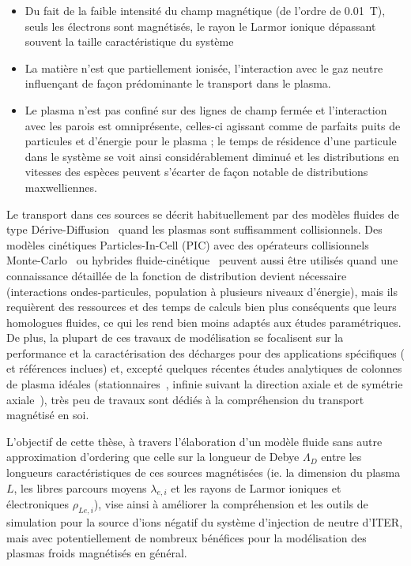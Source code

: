\begin{refsection}
\begin{itemize}
  \item Du fait de la faible intensité du champ magnétique (de l'ordre de
  0.01~T), seuls les électrons sont magnétisés, le rayon le Larmor ionique dépassant souvent la
  taille caractéristique du système
  \item La matière n'est que partiellement ionisée, l'interaction avec
  le gaz neutre influençant de façon prédominante le transport dans le plasma.
  \item Le plasma n'est pas confiné sur des lignes de champ fermée et
  l'interaction avec les parois est omniprésente, celles-ci agissant comme de
  parfaits puits de particules et d'énergie pour le plasma ;
  le temps de résidence d'une particule dans le système se voit
  ainsi considérablement diminué et les distributions en vitesses des
  espèces peuvent s'écarter de façon notable de distributions maxwelliennes.
\end{itemize}

Le transport dans ces sources se décrit habituellement par des modèles fluides
de type Dérive-Diffusion~\parencite{Porteous,Lieberman,Rozhansky} quand les
plasmas sont suffisamment collisionnels. Des modèles
cinétiques Particles-In-Cell (PIC) avec des opérateurs collisionnels
Monte-Carlo~\parencite{PIC3D,Adam} ou hybrides
fluide-cinétique~\parencite{BoeufGarrigues} peuvent aussi être utilisés quand
une connaissance détaillée de la fonction de distribution devient nécessaire
(interactions ondes-particules, population à plusieurs niveaux d'énergie), mais
ils requièrent des ressources et des temps de calculs bien plus conséquents que
leurs homologues fluides, ce qui les rend bien moins adaptés aux études
paramétriques. De plus, la plupart de ces travaux de modélisation se focalisent
sur la performance et la caractérisation des décharges pour des applications
spécifiques (\parencite{Lieberman} et références inclues) et, excepté quelques
récentes études analytiques de colonnes de plasma idéales
(stationnaires~\parencite{Sternberg}, infinie suivant la direction axiale et de
symétrie axiale~\parencite{Fruchtman}), très peu de travaux sont dédiés à la
compréhension du transport magnétisé en soi.


				
L'objectif de cette thèse, à travers l'élaboration d'un modèle fluide sans
autre approximation d'ordering que celle sur la longueur de Debye
$\Lambda_D$ entre les longueurs caractéristiques de ces sources magnétisées (ie.
la dimension du plasma $L$, les libres parcours moyens $\lambda_{e,i}$ et les rayons de Larmor ioniques et électroniques
$\rho_{Le,i}$),
vise ainsi à améliorer la compréhension et les outils de simulation pour
la source d'ions négatif du système d'injection de neutre d'ITER, mais avec
potentiellement de nombreux bénéfices pour la modélisation des plasmas froids magnétisés en général.
		

\end{refsection}
